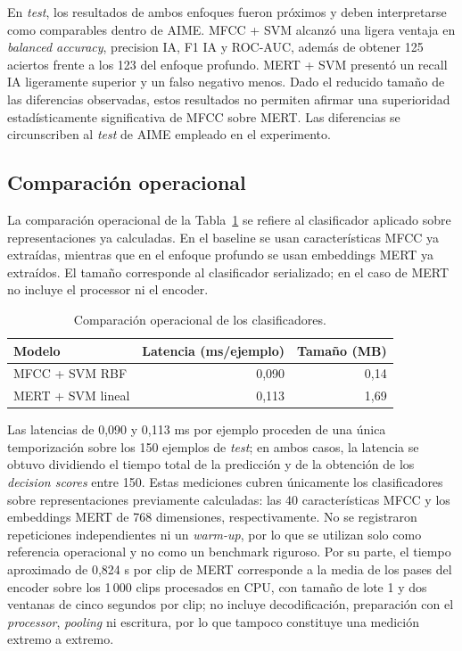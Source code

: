 En \textit{test}, los resultados de ambos enfoques fueron próximos y deben interpretarse como comparables dentro de AIME. MFCC + SVM alcanzó una ligera ventaja en \textit{balanced accuracy}, precision IA, F1 IA y ROC-AUC, además de obtener 125 aciertos frente a los 123 del enfoque profundo. MERT + SVM presentó un recall IA ligeramente superior y un falso negativo menos. Dado el reducido tamaño de las diferencias observadas, estos resultados no permiten afirmar una superioridad estadísticamente significativa de MFCC sobre MERT. Las diferencias se circunscriben al \textit{test} de AIME empleado en el experimento.

\subsection*{Comparación operacional}

La comparación operacional de la Tabla~\ref{tab:comparacion-operacional} se refiere al clasificador aplicado sobre representaciones ya calculadas. En el baseline se usan características MFCC ya extraídas, mientras que en el enfoque profundo se usan embeddings MERT ya extraídos. El tamaño corresponde al clasificador serializado; en el caso de MERT no incluye el processor ni el encoder.

\begin{table}[H]
    \centering
    \begin{tabular}{lrr}
        \hline
        \textbf{Modelo} & \textbf{Latencia (ms/ejemplo)} & \textbf{Tamaño (MB)} \\
        \hline
        MFCC + SVM RBF & 0,090 & 0,14 \\
        MERT + SVM lineal & 0,113 & 1,69 \\
        \hline
    \end{tabular}
    \caption{Comparación operacional de los clasificadores.}
    \label{tab:comparacion-operacional}
\end{table}

Las latencias de 0,090 y 0,113 ms por ejemplo proceden de una única temporización sobre los 150 ejemplos de \textit{test}; en ambos casos, la latencia se obtuvo dividiendo el tiempo total de la predicción y de la obtención de los \textit{decision scores} entre 150. Estas mediciones cubren únicamente los clasificadores sobre representaciones previamente calculadas: las 40 características MFCC y los embeddings MERT de 768 dimensiones, respectivamente. No se registraron repeticiones independientes ni un \textit{warm-up}, por lo que se utilizan solo como referencia operacional y no como un benchmark riguroso. Por su parte, el tiempo aproximado de 0,824 s por clip de MERT corresponde a la media de los pases del encoder sobre los 1\,000 clips procesados en CPU, con tamaño de lote 1 y dos ventanas de cinco segundos por clip; no incluye decodificación, preparación con el \textit{processor}, \textit{pooling} ni escritura, por lo que tampoco constituye una medición extremo a extremo.

